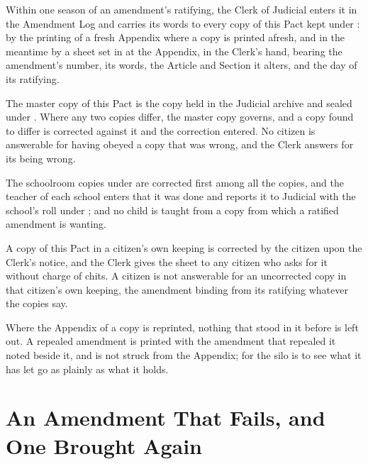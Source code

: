 \begin{clauses}
\item Within one season of an amendment's ratifying, the Clerk of Judicial enters it in the Amendment Log and carries its words to every copy of this Pact kept under : by the printing of a fresh Appendix where a copy is printed afresh, and in the meantime by a sheet set in at the Appendix, in the Clerk's hand, bearing the amendment's number, its words, the Article and Section it alters, and the day of its ratifying.
\item The master copy of this Pact is the copy held in the Judicial archive and sealed under . Where any two copies differ, the master copy governs, and a copy found to differ is corrected against it and the correction entered. No citizen is answerable for having obeyed a copy that was wrong, and the Clerk answers for its being wrong.
\item The schoolroom copies under  are corrected first among all the copies, and the teacher of each school enters that it was done and reports it to Judicial with the school's roll under ; and no child is taught from a copy from which a ratified amendment is wanting.
\item A copy of this Pact in a citizen's own keeping is corrected by the citizen upon the Clerk's notice, and the Clerk gives the sheet to any citizen who asks for it without charge of chits. A citizen is not answerable for an uncorrected copy in that citizen's own keeping, the amendment binding from its ratifying whatever the copies say.
\item Where the Appendix of a copy is reprinted, nothing that stood in it before is left out. A repealed amendment is printed with the amendment that repealed it noted beside it, and is not struck from the Appendix; for the silo is to see what it has let go as plainly as what it holds.
\end{clauses}

\section{An Amendment That Fails, and One Brought Again}
\label{sec:amendment:amendment-that-fails-and-an-amendment-brought-again}

